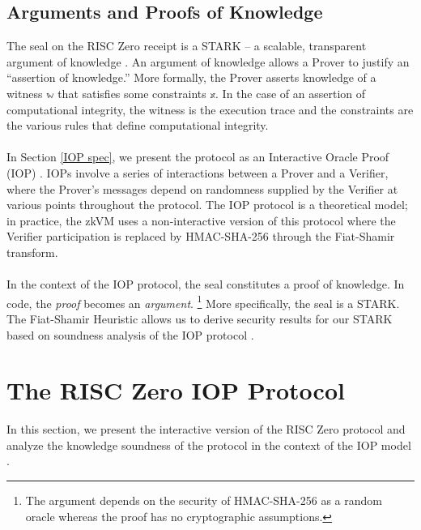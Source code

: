 \documentclass[10pt,letterpaper,titlepage]{article}
\theoremstyle{definition}
\begin{document}
\subsection{Arguments and Proofs of Knowledge} 
\label{arguments}
The seal on the RISC Zero receipt is a STARK -- a scalable, transparent argument of knowledge \cite{stark}. 
An argument of knowledge allows a Prover to justify an ``assertion of knowledge.'' 
More formally, the Prover asserts knowledge of a witness $\mathbb{w}$ that satisfies some constraints $\mathbb{x}$. 
In the case of an assertion of computational integrity, the witness is the execution trace and the constraints are the various rules that define computational integrity. \\
\\
In Section \ref{IOP spec}, we present the protocol as an Interactive Oracle Proof (IOP) \cite{iop}.  
IOPs involve a series of interactions between a Prover and a Verifier, where the Prover's messages depend on randomness supplied by the Verifier at various points throughout the protocol. 
The IOP protocol is a theoretical model; in practice, the zkVM uses a non-interactive version of this protocol where the Verifier participation is replaced by HMAC-SHA-256 through the Fiat-Shamir transform.\\
\\
In the context of the IOP protocol, the seal constitutes a proof of knowledge. In code, the \textit{proof} becomes an \textit{argument}.%
\footnote{The argument depends on the security of HMAC-SHA-256 as a random oracle whereas the proof has no cryptographic assumptions.}
More specifically, the seal is a STARK. 
The Fiat-Shamir Heuristic allows us to derive security results for our STARK based on soundness analysis of the IOP protocol \cite{fiat-shamir}.

\section{The RISC Zero IOP Protocol}
\label{iop}
In this section, we present the interactive version of the RISC Zero protocol and analyze the knowledge soundness of the protocol in the context of the IOP model \cite{iop}. 
\end{document}
